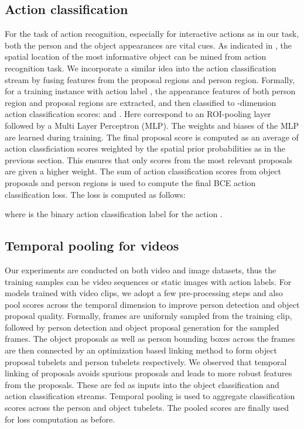 \documentclass[10pt,twocolumn,letterpaper]{article}
\begin{document}
\subsection{Action classification}
\vspace{-0.3\baselineskip}
For the task of action recognition, especially for interactive actions as in our task, both the person and the object appearances are vital cues. As indicated in \cite{gkioxari2015contextual}, the spatial location of the most informative object can be mined from action recognition task. We incorporate a similar idea into the action classification stream by fusing features from the proposal regions and person region. Formally, for a training instance with action label , the appearance features of both person region  and proposal regions  are extracted, and then classified to -dimension action classification scores:  and . Here  correspond to an ROI-pooling layer followed by a Multi Layer Perceptron (MLP). The weights and biases of the MLP are learned during training. The final proposal score is computed as an average of action classficiation scores weighted by the spatial prior probabilities as in the previous section. This ensures that only scores from the most relevant proposals are given a higher weight. The sum of action classification scores from object proposals and person regions is used to compute the final BCE action classification loss. The loss is computed as follows:
\vspace{-0.3\baselineskip}
{\small
}
\vspace{-0.6\baselineskip}

\noindent where  is the binary action classification label for the action .


\vspace{-0.3\baselineskip}
\subsection{Temporal pooling for videos}
\vspace{-0.3\baselineskip}
Our experiments are conducted on both video and image datasets, thus the training samples can be video sequences or static images with action labels. For models trained with video clips, we adopt a few pre-processing steps and also pool scores across the temporal dimension to improve person detection and object proposal quality. Formally,  frames are uniformly sampled from the training clip, followed by person detection and object proposal generation for the sampled frames. The object proposals as well as person bounding boxes across the frames are then connected by an optimization based linking method \cite{gkioxari2015finding,yang2017spatio} to form object proposal tubelets and person tubelets respectively. We observed that temporal linking of proposals avoids spurious proposals and leads to more robust features from the proposals. These are fed as inputs into the object classification and action classification streams. Temporal pooling is used to aggregate classification scores across the person and object tubelets. The pooled scores are finally used for loss computation as before. 
\vspace{-0.4\baselineskip}
\end{document}

